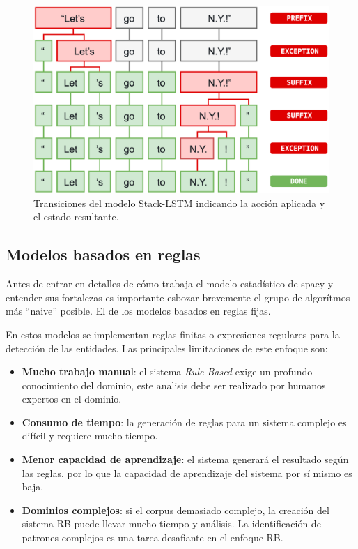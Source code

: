 \documentclass[12pt,a4paper,]{scrartcl}
\providecommand{\tightlist}{%
  \setlength{\itemsep}{0pt}\setlength{\parskip}{0pt}}
\begin{document}
\begin{figure}[H]

{\centering \includegraphics{assets/spacy_tokenization.pdf} 

}

\caption{Transiciones del modelo Stack-LSTM indicando la acción aplicada y el estado resultante.}\label{fig:spacy-tokenization}
\end{figure}

\hypertarget{modelos-basados-en-reglas}{%
\subsection{Modelos basados en reglas}\label{modelos-basados-en-reglas}}

Antes de entrar en detalles de cómo trabaja el modelo estadístico de spacy y entender sus fortalezas es importante esbozar brevemente el grupo de algorítmos más \enquote{naive} posible. El de los modelos basados en reglas fijas.

En estos modelos se implementan reglas finitas o expresiones regulares para la detección de las entidades. Las principales limitaciones de este enfoque son:

\begin{itemize}
\tightlist
\item
  \textbf{Mucho trabajo manua}l: el sistema \emph{Rule Based} exige un profundo conocimiento del dominio, este analisis debe ser realizado por humanos expertos en el dominio.
\item
  \textbf{Consumo de tiempo}: la generación de reglas para un sistema complejo es difícil y requiere mucho tiempo.
\item
  \textbf{Menor capacidad de aprendizaje}: el sistema generará el resultado según las reglas, por lo que la capacidad de aprendizaje del sistema por sí mismo es baja.
\item
  \textbf{Dominios complejos}: si el corpus demasiado complejo, la creación del sistema RB puede llevar mucho tiempo y análisis. La identificación de patrones complejos es una tarea desafiante en el enfoque RB.
\end{itemize}
\end{document}
